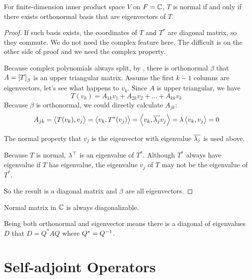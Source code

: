 \begin{theorem}\label{normal_orthonormal_with_complex_space}
    For finite-dimension inner product space $V$ on $F=\mathbb{C}$, $T$ is normal if and only if there exists orthonormal basis that are eigenvectors of $T$.
\end{theorem}
\begin{proof}
    If such basis exists, the coordinates of $T$ and $T^*$ are diagonal matrix, so they commute. We do not need the complex feature here. The difficult is on the other side of proof and we need the complex property.
    
    Because complex polynomials always split, by , there is orthonormal $\beta$ that $A=\coordinate{T}_\beta$ is an upper triangular matrix. Assume the first $k-1$ columns are eigenvectors, let's see what happens to $v_{k}$. Since $A$ is upper triangular, we have
    \begin{equation*}
        T(v_k) = A_{1k} v_1 + A_{2k} v_2 + ... + A_{kk} v_k
    \end{equation*}
    Because $\beta$ is orthonormal, we could directly calculate $A_{jk}$:
    \begin{equation*}
        A_{jk} = \left\langle \displaystyle T(v_k), v_j \right\rangle = \left\langle \displaystyle v_k, T^*(v_j) \right\rangle = \left\langle \displaystyle v_k, \overline{\lambda_j} v_j \right\rangle = \lambda \left\langle \displaystyle v_k, v_j \right\rangle = 0
    \end{equation*}
    
    The normal property that $v_j$ is the eigenvector with eigenvalue $\overline{\lambda_j}$ is used above.
    
    Because $T$ is normal, ${\lambda}^\top$ is an eigenvalue of $T^*$. Although $T^*$ always have eigenvalue if $T$ has eigenvalue, the eigenvalue $v_j$ of $T$ may not be the eigenvalue of $T^*$.
    
    So the result is a diagonal matrix and $\beta$ are all eigenvectors.
\end{proof}

\begin{theorem}
    Normal matrix in $\mathbb{C}$ is always diagonalizable.
\end{theorem}


Being both orthonormal and eigenvector means there is a diagonal of eigenvalues $D$ that $D = Q^* A Q$ where $Q^* = {Q}^{-1}$.


\section{Self-adjoint Operators}

